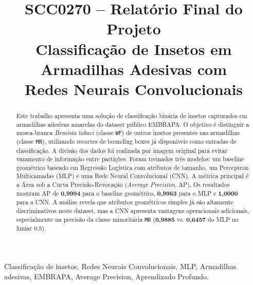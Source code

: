 \documentclass[conference]{IEEEtran}
\begin{document}
\title{SCC0270 -- Relatório Final do Projeto\\
\large Classificação de Insetos em Armadilhas Adesivas com\\
Redes Neurais Convolucionais}

\author{
}

\maketitle

\begin{abstract}
Este trabalho apresenta uma solução de classificação binária de insetos
capturados em armadilhas adesivas amarelas do dataset público EMBRAPA.
O objetivo é distinguir a mosca-branca \textit{Bemisia tabaci} (classe \texttt{WF})
de outros insetos presentes nas armadilhas (classe \texttt{MR}), utilizando
recortes de bounding boxes já disponíveis como entradas de classificação.
A divisão dos dados foi realizada por imagem original para evitar vazamento
de informação entre partições. Foram treinados três modelos: um baseline
geométrico baseado em Regressão Logística com atributos de tamanho, um
Perceptron Multicamadas (MLP) e uma Rede Neural Convolucional (CNN).
A métrica principal é a Área sob a Curva Precisão-Revocação
(\textit{Average Precision}, AP). Os resultados mostram AP de \textbf{0,9994}
para o baseline geométrico, \textbf{0,9963} para o MLP e \textbf{1,0000}
para a CNN. A análise revela que atributos geométricos simples já são
altamente discriminativos neste dataset, mas a CNN apresenta vantagens
operacionais adicionais, especialmente na precisão da classe minoritária
\texttt{MR} (\textbf{0,9885} vs. \textbf{0,6457} do MLP no limiar 0,5).
\end{abstract}

\begin{IEEEkeywords}
Classificação de insetos, Redes Neurais Convolucionais, MLP,
Armadilhas adesivas, EMBRAPA, Average Precision, Aprendizado Profundo.
\end{IEEEkeywords}
\end{document}
